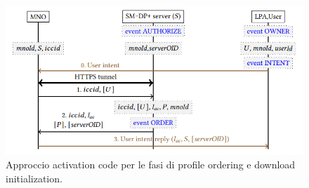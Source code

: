 \documentclass[10pt, twoside, openany]{book}
\begin{document}
\begin{figure}
\includegraphics[width=\linewidth]{activation-code.png}
\caption{Approccio activation code per le fasi di profile ordering e download initialization.}
\label{fig:activation-code}
\end{figure}
\end{document}
